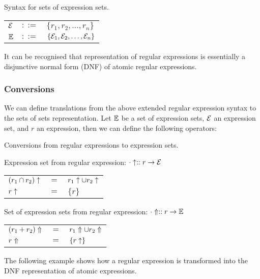 \begin{defn}
   \label{defn-esets}
   Syntax for sets of expression sets.

   \begin{tabular}{lll}
      $\mathcal{E}$	& $::=$ & $\{r_1, r_2, \dots, r_n\}$ \\
      $\mathbb{E}$	& $::=$ & $\{\mathcal{E}_1, \mathcal{E}_2, \dots, \mathcal{E}_n\}$ \\
   \end{tabular}
\end{defn}

It can be recognised that representation of regular expressions is essentially a
disjunctive normal form (DNF) of atomic regular expressions.

\subsubsection{Conversions}

We can define translations from the above extended regular expression syntax to
the sets of sets representation. Let $\mathbb{E}$ be a set of expression sets,
$\mathcal{E}$ an expression set, and $r$ an expression, then we can define the
following operators:

\begin{defn}
   \label{defn-re2esets}
   Conversions from regular expressions to expression sets.

   Expression set from regular expression:
   $\cdot\uparrow :: r \to \mathcal{E}$

   \begin{tabular}{lll}
      $(r_1 \cap r_2)\uparrow$	& $=$	& $r_1\uparrow \cup r_2\uparrow$	\\
      $r\uparrow$			& $=$	& $\{r\}$			\\
   \end{tabular}

   Set of expression sets from regular expression:
   $\cdot\Uparrow :: r \to \mathbb{E}$

   \begin{tabular}{lll}
      $(r_1 + r_2)\Uparrow$	& $=$	& $r_1\Uparrow \cup r_2\Uparrow$	\\
      $r\Uparrow$		& $=$	& $\{r\uparrow\}$			\\
   \end{tabular}
\end{defn}

The following example shows how a regular expression is transformed into the DNF
representation of atomic expressions.

